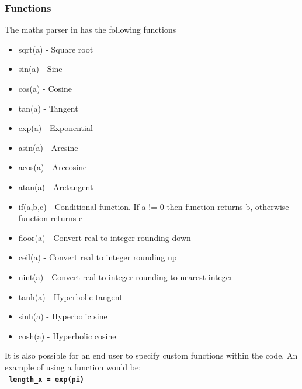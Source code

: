 \documentclass[12pt,a4paper]{article}
\newcommand{\inlinecode}[1]{{\color{warwickred} \bf\texttt{#1}}}
\newcommand{\EPOCH}{{\color{warwickdark}\fontfamily{phv}\selectfont{EPOCH}}}
\begin{document}
\subsubsection{Functions}
The maths parser in {\EPOCH} has the following functions
\begin{itemize}
\item sqrt(a) - Square root
\item sin(a) - Sine
\item cos(a) - Cosine
\item tan(a) - Tangent
\item exp(a) - Exponential
\item asin(a) - Arcsine
\item acos(a) - Arccosine
\item atan(a) - Arctangent
\item if(a,b,c) - Conditional function. If a != 0 then function returns b,
  otherwise function returns c
\item floor(a) - Convert real to integer rounding down
\item ceil(a) - Convert real to integer rounding up
\item nint(a) - Convert real to integer rounding to nearest integer
\item tanh(a) - Hyperbolic tangent
\item sinh(a) - Hyperbolic sine
\item cosh(a) - Hyperbolic cosine
\end{itemize}

It is also possible for an end user to specify custom functions within the
code. An example of using a function would be:\\
\inlinecode{  length\_x = exp(pi)}\\
\end{document}
